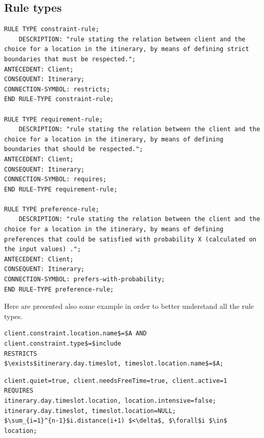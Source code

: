 \documentclass[11pt]{article} %
\begin{document}
\subsection{Rule types}

\begin{lstlisting}[label=Rules,caption=Rules,breaklines=true]
RULE TYPE constraint-rule;
    DESCRIPTION: "rule stating the relation between client and the choice for a location in the itinerary, by means of defining strict boundaries that must be respected.";
ANTECEDENT: Client;
CONSEQUENT: Itinerary;
CONNECTION-SYMBOL: restricts;
END RULE-TYPE constraint-rule;

RULE TYPE requirement-rule;
    DESCRIPTION: "rule stating the relation between the client and the choice for a location in the itinerary, by means of defining boundaries that should be respected.";
ANTECEDENT: Client;
CONSEQUENT: Itinerary;
CONNECTION-SYMBOL: requires;
END RULE-TYPE requirement-rule;

RULE TYPE preference-rule;
    DESCRIPTION: "rule stating the relation between the client and the choice for a location in the itinerary, by means of defining preferences that could be satisfied with probability X (calculated on the input values) .";
ANTECEDENT: Client;
CONSEQUENT: Itinerary;
CONNECTION-SYMBOL: prefers-with-probability;
END RULE-TYPE preference-rule;
\end{lstlisting}


\noindent
Here are presented also some example in order to better understand all the rule types.

\begin{lstlisting}[label=Rules,caption=The client wants to include a destination into the itinerary.,breaklines=true,mathescape=true]
client.constraint.location.name$=$A AND client.constraint.type$=$include
RESTRICTS
$\exists$itinerary.day.timeslot, timeslot.location.name$=$A;
\end{lstlisting}



\begin{lstlisting}[label=Rules,caption=The client is a quite person,breaklines=true,mathescape=true]
client.quiet=true, client.needsFreeTime=true, client.active=1
REQUIRES
itinerary.day.timeslot.location, location.intensive=false;
itinerary.day.timeslot, timeslot.location=NULL;
$\sum_{i=1}^{n-1}$i.distance(i+1) $<\delta$, $\forall$i $\in$ location;
\end{lstlisting}
\end{document}
